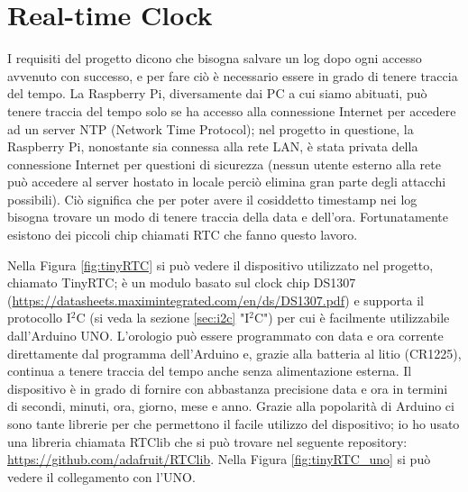 \documentclass[12pt]{report}
\begin{document}
%
\section{Real-time Clock}
%

I requisiti del progetto dicono che bisogna salvare un log dopo ogni accesso avvenuto con successo, e per fare ciò è necessario essere in grado di tenere traccia del tempo. La Raspberry Pi, diversamente dai PC a cui siamo abituati, può tenere traccia del tempo solo se ha accesso alla connessione Internet per accedere ad un server NTP (Network Time Protocol); nel progetto in questione, la Raspberry Pi, nonostante sia connessa alla rete LAN, è stata privata della connessione Internet per questioni di sicurezza (nessun utente esterno alla rete può accedere al server hostato in locale perciò elimina gran parte degli attacchi possibili). Ciò significa che per poter avere il cosiddetto timestamp nei log bisogna trovare un modo di tenere traccia della data e dell'ora. Fortunatamente esistono dei piccoli chip chiamati RTC che fanno questo lavoro. 

Nella Figura \ref{fig:tinyRTC} si può vedere il dispositivo utilizzato nel progetto, chiamato TinyRTC; è un modulo basato sul clock chip DS1307 (\url{https://datasheets.maximintegrated.com/en/ds/DS1307.pdf}) e supporta il protocollo I$^2$C (si veda la sezione \ref{sec:i2c} "I$^2$C") per cui è facilmente utilizzabile dall'Arduino UNO.
L'orologio può essere programmato con data e ora corrente direttamente dal programma dell'Arduino e, grazie alla batteria al litio (CR1225), continua a tenere traccia del tempo anche senza alimentazione esterna. Il dispositivo è in grado di fornire con abbastanza precisione data e ora in termini di secondi, minuti, ora, giorno, mese e anno. Grazie alla popolarità di Arduino ci sono tante librerie per che permettono il facile utilizzo del dispositivo; io ho usato una libreria chiamata RTClib che si può trovare nel seguente repository: \url{https://github.com/adafruit/RTClib}. Nella Figura \ref{fig:tinyRTC_uno} si può vedere il collegamento con l'UNO.
\end{document}
